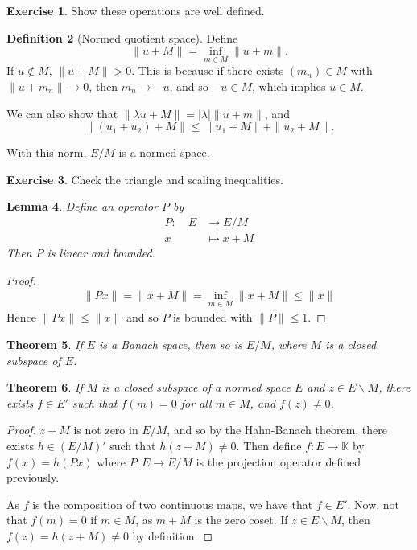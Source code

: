\documentclass[10pt, oneside, reqno]{amsart}
\theoremstyle{plain}%
\newtheorem{thm}{Theorem}[section]
\newtheorem{lem}[thm]{Lemma}
\numberwithin{equation}{section}
\theoremstyle{definition}
\newtheorem{defn}[thm]{Definition}
\newtheorem{exer}[thm]{Exercise}
\theoremstyle{remark}
\newcommand{\K}{\mathbb{K}}
\newcommand{\mapping}[5]{\begin{align*}
	#1 : \quad     #2 &\rightarrow #3 \\
			#4  &\mapsto #5
\end{align*}	
}
\begin{document}
\begin{exer}
	Show these operations are well defined.  
\end{exer}  

\begin{defn}[Normed quotient space]
	Define \[
	\| u + M \| = \inf_{m \in M} \| u + m \|. 
	\]  If $u \notin M$, $\| u + M \| > 0$.  This is because if there exists $(m_n) \in M$ with $\| u + m_n \| \rightarrow 0$, then $m_n \rightarrow -u$, and so $-u \in M$, which implies $u \in M$.  

	We can also show that  $\| \lambda u + M \| = |\lambda| \| u + m \|$, and \[
		\| (u_1 + u_2) + M \| \leq \| u_1 + M \| + \| u_2 + M \|.
	\]  

	With this norm, $E/M$ is a normed space.
\end{defn}

\begin{exer}
	Check the triangle and scaling inequalities.
\end{exer}

\begin{lem}
	Define an operator $P$ by \mapping{P}{E}{E/M}{x}{x + M}  Then $P$ is linear and bounded.  
\end{lem}  


\begin{proof}
	\begin{align*}
		\| Px \| = \| x + M \| = \inf_{m \in M} \| x + M \| \leq \| x \|
	\end{align*}  Hence $\| Px \| \leq \| x \|$ and so $P$ is bounded with $\| P \| \leq 1$.  
\end{proof}

\begin{thm}
	If $E$ is a Banach space, then so is $E / M$, where $M$ is a closed subspace of $E$. 
\end{thm}

\begin{thm}
	If $M$ is a closed subspace of a normed space $E$ and $z \in E \backslash M$, there exists $f \in E'$ such that $f(m) = 0$ for all $m \in M$, and $f(z) \neq 0$.  
\end{thm}

\begin{proof}
	$z + M$ is not zero in $E/M$, and so by the Hahn-Banach theorem, there exists $h \in (E/M)'$ such that $h(z+M) \neq 0$.  Then define $f: E \rightarrow \K$ by $f(x) = h(Px)$ where $P : E \rightarrow E/M$ is the projection operator defined previously.
	
	As $f$ is the composition of two continuous maps, we have that $f \in E'$.  Now, not that $f(m) = 0$ if $m \in M$, as $m + M$ is the zero coset.  If $z \in E\backslash M$, then $f(z) = h(z+M) \neq 0$ by definition.         
\end{proof}  
\end{document}

